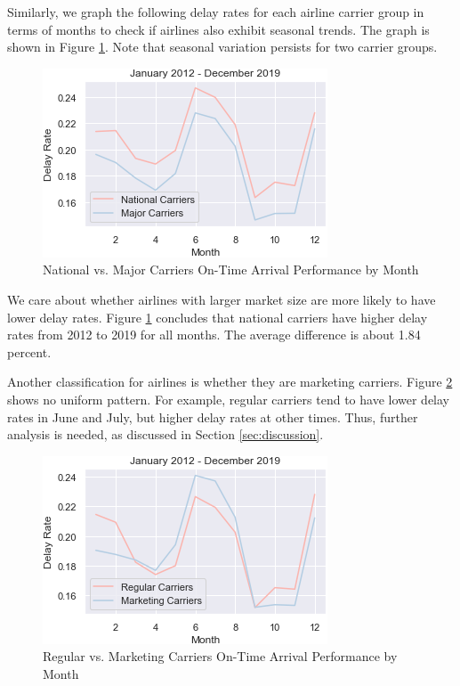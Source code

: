\documentclass[11pt]{article}
\begin{document}
Similarly, we graph the following delay rates for each airline carrier group in terms of months to check if airlines also exhibit seasonal trends. The graph is shown in Figure \ref{fig:line_plot3}. Note that seasonal variation persists for two carrier groups.

\begin{figure}[h!]
\centering
\includegraphics[width = \columnwidth]{line_plot3}
\caption{National vs. Major Carriers On-Time Arrival Performance by Month}\label{fig:line_plot3}
\end{figure}

We care about whether airlines with larger market size are more likely to have lower delay rates. Figure \ref{fig:line_plot3} concludes that national carriers have higher delay rates from 2012 to 2019 for all months. The average difference is about 1.84 percent.

Another classification for airlines is whether they are marketing carriers. Figure \ref{fig:line_plot4} shows no uniform pattern. For example, regular carriers tend to have lower delay rates in June and July, but higher delay rates at other times. Thus, further analysis is needed, as discussed in Section \ref{sec:discussion}. 

\begin{figure}[h!]
\centering
\includegraphics[width = \columnwidth]{line_plot4}
\caption{Regular vs. Marketing Carriers On-Time Arrival Performance by Month}\label{fig:line_plot4}
\end{figure}
\end{document}
